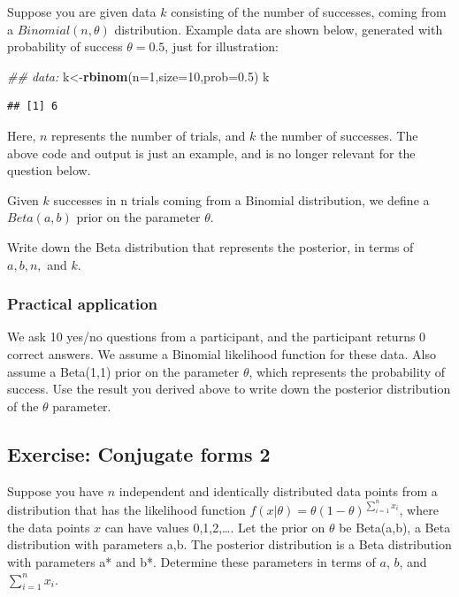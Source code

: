 \documentclass[12pt,]{krantz}
\newenvironment{Shaded}{\begin{snugshade}}{\end{snugshade}}
\newcommand{\CommentTok}[1]{\textcolor[rgb]{0.56,0.35,0.01}{\textit{#1}}}
\newcommand{\DataTypeTok}[1]{\textcolor[rgb]{0.13,0.29,0.53}{#1}}
\newcommand{\DecValTok}[1]{\textcolor[rgb]{0.00,0.00,0.81}{#1}}
\newcommand{\FloatTok}[1]{\textcolor[rgb]{0.00,0.00,0.81}{#1}}
\newcommand{\KeywordTok}[1]{\textcolor[rgb]{0.13,0.29,0.53}{\textbf{#1}}}
\newcommand{\NormalTok}[1]{#1}
\theoremstyle{definition}
\theoremstyle{definition}
\theoremstyle{definition}
\theoremstyle{remark}
\begin{document}
Suppose you are given data \(k\) consisting of the number of successes, coming from a \(Binomial(n,\theta)\) distribution. Example data are shown below, generated with probability of success \(\theta=0.5\), just for illustration:

\begin{Shaded}
\begin{Highlighting}[]
\CommentTok{## data:}
\NormalTok{k<-}\KeywordTok{rbinom}\NormalTok{(}\DataTypeTok{n=}\DecValTok{1}\NormalTok{,}\DataTypeTok{size=}\DecValTok{10}\NormalTok{,}\DataTypeTok{prob=}\FloatTok{0.5}\NormalTok{)}
\NormalTok{k}
\end{Highlighting}
\end{Shaded}

\begin{verbatim}
## [1] 6
\end{verbatim}

Here, \(n\) represents the number of trials, and \(k\) the number of successes. The above code and output is just an example, and is no longer relevant for the question below.

Given \(k\) successes in n trials coming from a Binomial distribution, we define a \(Beta(a,b)\) prior on the parameter \(\theta\).

Write down the Beta distribution that represents the posterior, in terms of \(a,b, n,\) and \(k\).

\hypertarget{practical-application}{%
\subsubsection{Practical application}\label{practical-application}}

We ask 10 yes/no questions from a participant, and the participant returns 0 correct answers. We assume a Binomial likelihood function for these data. Also assume a Beta(1,1) prior on the parameter \(\theta\), which represents the probability of success. Use the result you derived above to write down the posterior distribution of the \(\theta\) parameter.

\hypertarget{exercise-conjugate-forms-2}{%
\subsection{Exercise: Conjugate forms 2}\label{exercise-conjugate-forms-2}}

Suppose you have \(n\) independent and identically distributed data points from a distribution that has
the likelihood function \(f(x|\theta)=\theta(1-\theta)^{\sum_{i=1}^n x_i}\),
where the data points \(x\) can have values 0,1,2,\dots. Let the prior on \(\theta\) be Beta(a,b), a Beta distribution with parameters a,b.
The posterior distribution is a Beta distribution with parameters a* and b*.
Determine these parameters in terms of \(a\), \(b\), and \(\sum_{i=1}^n x_i\).
\end{document}
